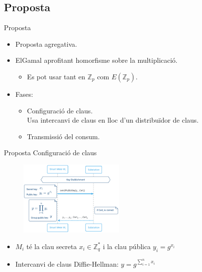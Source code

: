 \documentclass{beamer}
\begin{document}
\subsection{Proposta \cite{busom}}
\begin{frame}{Proposta \cite{busom}}
\begin{itemize}
	\item Proposta agregativa.
	\item ElGamal aprofitant homorfisme sobre la multiplicació.
	\begin{itemize}
		\item Es pot usar tant en $\mathbb{Z}_p$ com $E(\mathbb{Z}_p)$.
	\end{itemize}
	\item Fases:
	\begin{itemize}
		\item Configuració de claus.\\Usa intercanvi de claus en lloc d'un distribuïdor de claus.
		\item Transmissió del consum.
	\end{itemize}
\end{itemize}
\end{frame}

\begin{frame}{Proposta \cite{busom}}{Configuració de claus}
	\begin{multicols}{2}
		
		\begin{figure}
			\includegraphics[width=14em]{images/busom2.png}
		\end{figure}
	\newpage
	\begin{itemize}
		\item $M_i$ té la clau secreta $x_i \in \mathbb{Z}_q^* $ i la clau pública $y_i = g^{x_i}$
		\item Intercanvi de claus Diffie-Hellman: $y = g^{\sum_{i=1}^{n} x_i}$
		
	\end{itemize}
	\end{multicols}
\end{frame}
\end{document}
